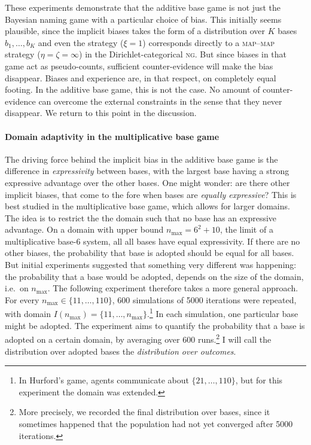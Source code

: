 \documentclass{../src/bcthesispart}
\begin{document}
These experiments demonstrate that the additive base game is not just the Bayesian naming game with a particular choice of bias.
This initially seems plausible, since the implicit biases takes the form of a distribution over $K$ bases $b_1, \dots, b_K$ and even the strategy ($\xi=1$) corresponds directly to a \textsc{map--map} strategy ($\eta=\zeta=\infty$) in the Dirichlet-categorical \textsc{ng}.
But since biases in that game act as pseudo-counts, sufficient counter-evidence will make the bias disappear.
Biases and experience are, in that respect, on completely equal footing.
In the additive base game, this is not the case. 
No amount of counter-evidence can overcome the external constraints in the sense that they never disappear.
We return to this point in the discussion.




\paragraph{Domain adaptivity in the multiplicative base game}

The driving force behind the implicit bias in the additive base game is the difference in \emph{expressivity} between bases, with the largest base having a strong expressive advantage over the other bases.
One might wonder: are there other implicit biases, that come to the fore when bases are \emph{equally expressive}?
This is best studied in the multiplicative base game, which allows for larger domains.
The idea is to restrict the the domain such that no base has an expressive advantage. 
On a domain with upper bound $n_{\text{max}} = 6^2 + 10$, the limit of a multiplicative base-6 system, all all bases have equal expressivity.
If there are no other biases, the probability that base is adopted should be equal for all bases.
But initial experiments suggested that something very different was happening: the probability that a base would be adopted, depends on the size of the domain, i.e.\ on $n_{\text{max}}$.
The following experiment therefore takes a more general approach.
For every $n_{\text{max}} \in \{11, \dots, 110\}$, 600 simulations of 5000 iterations were repeated, with domain $I(n_{\text{max}}) = \{11, \dots, n_{\text{max}}\}$.\footnote{%
	In Hurford’s game, agents communicate about $\{21, \dots, 110\}$, but for this experiment the domain was extended.
	}
In each simulation, one particular base might be adopted.
The experiment aims to quantify the probability that a base is adopted on a certain domain, by averaging over 600 runs.\footnote{%
	More precisely, we recorded the final distribution over bases, since it sometimes happened that the population had not yet converged after 5000 iterations.
	}
I will call the distribution over adopted bases the \emph{distribution over outcomes}.
\end{document}
